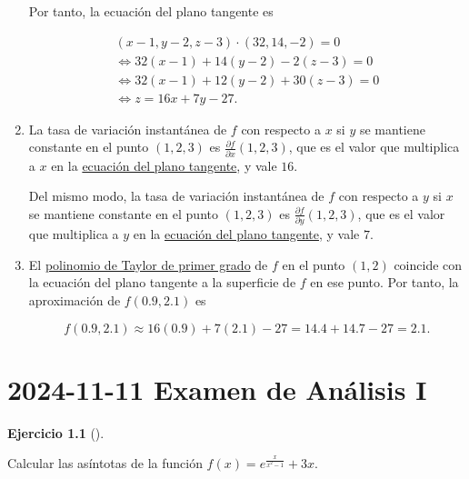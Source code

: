 \documentclass[
  a4paper,
]{scrreport}
\theoremstyle{definition}
\newtheorem{exercise}{Ejercicio}[chapter]
\theoremstyle{remark}
\begin{document}
\begin{tcolorbox}
\begin{enumerate}
  Por tanto, la ecuación del plano tangente es

  \[
  \begin{gathered}
  (x-1, y-2, z-3) \cdot (32, 14, -2) = 0 \\
  \Leftrightarrow 32(x-1) + 14(y-2) - 2(z-3) = 0 \\
  \Leftrightarrow 32(x-1) + 12(y-2) + 30(z-3) = 0 \\
  \Leftrightarrow z = 16x + 7y - 27.
  \end{gathered}
  \]
\item
  La tasa de variación instantánea de \(f\) con respecto a \(x\) si
  \(y\) se mantiene constante en el punto \((1,2,3)\) es
  \(\frac{\partial f}{\partial x}(1,2,3)\), que es el valor que
  multiplica a \(x\) en la
  \href{https://aprendeconalf.es/analisis-manual/13-derivadas-funciones-varias-variables.html\#def-plano-tangente-superficie}{ecuación
  del plano tangente}, y vale \(16\).

  Del mismo modo, la tasa de variación instantánea de \(f\) con respecto
  a \(y\) si \(x\) se mantiene constante en el punto \((1,2,3)\) es
  \(\frac{\partial f}{\partial y}(1,2,3)\), que es el valor que
  multiplica a \(y\) en la
  \href{https://aprendeconalf.es/analisis-manual/13-derivadas-funciones-varias-variables.html\#def-plano-tangente-superficie}{ecuación
  del plano tangente}, y vale \(7\).
\item
  El
  \href{https://aprendeconalf.es/analisis-manual/13-derivadas-funciones-varias-variables.html\#aproximaci\%C3\%B3n-lineal-de-una-funci\%C3\%B3n-de-varias-variables}{polinomio
  de Taylor de primer grado} de \(f\) en el punto \((1,2)\) coincide con
  la ecuación del plano tangente a la superficie de \(f\) en ese punto.
  Por tanto, la aproximación de \(f(0.9, 2.1)\) es

  \[
  f(0.9, 2.1) \approx 16(0.9) + 7(2.1) - 27 = 14.4 + 14.7 - 27 = 2.1.
  \]
\end{enumerate}

\end{tcolorbox}


\chapter{\texorpdfstring{2024-11-11 Examen de Análisis
I}{2024-11-11  Examen de Análisis I}}\label{examen-de-anuxe1lisis-i-4}

\begin{exercise}[]\protect\hypertarget{exr-1}{}\label{exr-1}

Calcular las asíntotas de la función \(f(x) = e^{\frac{x}{x^2-1}}+3x\).

\end{exercise}
\end{document}
